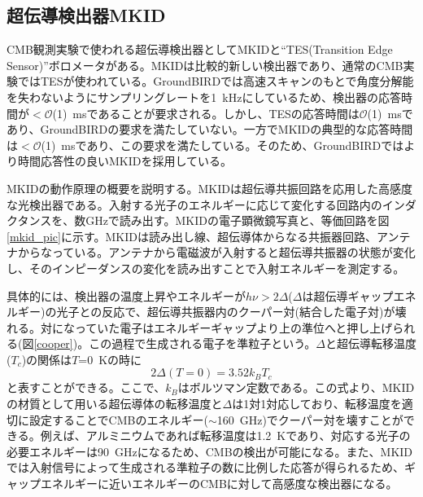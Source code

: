 \subsection{超伝導検出器MKID}
CMB観測実験で使われる超伝導検出器としてMKIDと``TES(Transition Edge Sensor)''ボロメータがある。MKIDは比較的新しい検出器であり、通常のCMB実験ではTESが使われている。GroundBIRDでは高速スキャンのもとで角度分解能を失わないようにサンプリングレートを\SI{1}{kHz}にしているため、検出器の応答時間が$< \mathcal{O}$(1)~msであることが要求される。しかし、TESの応答時間は$\mathcal{O}$(1)~msであり\cite{TES_res}、GroundBIRDの要求を満たしていない。一方でMKIDの典型的な応答時間は$< \mathcal{O}$(1)~msであり\cite{MKID_res}、この要求を満たしている。そのため、GroundBIRDではより時間応答性の良いMKIDを採用している。

MKIDの動作原理の概要を説明する。MKIDは超伝導共振回路を応用した高感度な光検出器である。入射する光子のエネルギーに応じて変化する回路内のインダクタンスを、数GHzで読み出す。MKIDの電子顕微鏡写真\cite{MKID_pic}と、等価回路を図\ref{mkid_pic}に示す。MKIDは読み出し線、超伝導体からなる共振器回路、アンテナからなっている。アンテナから電磁波が入射すると超伝導共振器の状態が変化し、そのインピーダンスの変化を読み出すことで入射エネルギーを測定する。

具体的には、検出器の温度上昇やエネルギーが$h\nu > 2\Delta$($\Delta$は超伝導ギャップエネルギー)の光子との反応で、超伝導共振器内のクーパー対(結合した電子対)が壊れる。対になっていた電子はエネルギーギャップより上の準位へと押し上げられる(図\ref{cooper})。この過程で生成される電子を準粒子という。$\Delta$と超伝導転移温度($T_{c}$)の関係は$T$=\SI{0}{K}の時に
\begin{equation}
  2\Delta(T=0) = 3.52k_{B}T_{c}
\end{equation}
と表すことができる\cite{bcs}。ここで、$k_{B}$はボルツマン定数である。この式より、MKIDの材質として用いる超伝導体の転移温度と$\Delta$は1対1対応しており、転移温度を適切に設定することでCMBのエネルギー($\sim$\SI{160}{GHz})でクーパー対を壊すことができる。例えば、アルミニウムであれば転移温度は\SI{1.2}{K}であり、対応する光子の必要エネルギーは\SI{90}{GHz}になるため、CMBの検出が可能になる。また、MKIDでは入射信号によって生成される準粒子の数に比例した応答が得られるため、ギャップエネルギーに近いエネルギーのCMBに対して高感度な検出器になる。

